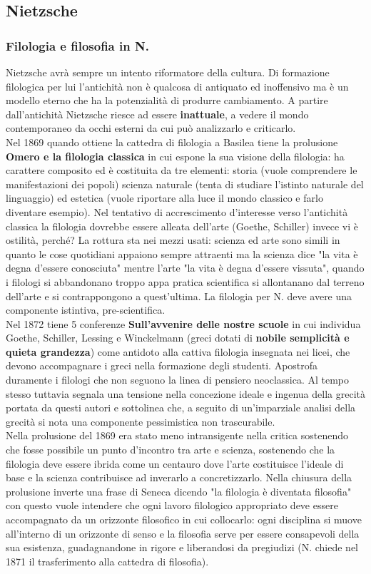\documentclass[10pt,a4paper]{article}
\begin{document}
\subsection{Nietzsche}
\subsubsection{Filologia e filosofia in N.}
 Nietzsche avrà sempre un intento riformatore della cultura. Di formazione filologica per lui l'antichità non è qualcosa di antiquato ed inoffensivo ma è un modello eterno che ha la potenzialità di produrre cambiamento. A partire dall'antichità Nietzsche riesce ad essere \textbf{inattuale}, a vedere il mondo contemporaneo da occhi esterni da cui può analizzarlo e criticarlo.\\
Nel 1869 quando ottiene la cattedra di filologia a Basilea tiene la prolusione \textbf{Omero e la filologia classica} in cui espone la sua visione della filologia: ha carattere composito ed è costituita da tre elementi: storia (vuole comprendere le manifestazioni dei popoli) scienza naturale (tenta di studiare l'istinto naturale del linguaggio) ed estetica (vuole riportare alla luce il mondo classico e farlo diventare esempio). Nel tentativo di accrescimento d'interesse verso l'antichità classica la filologia dovrebbe essere alleata dell'arte (Goethe, Schiller) invece vi è ostilità, perché? La rottura sta nei mezzi usati: scienza ed arte sono simili in quanto le cose quotidiani appaiono sempre attraenti ma la scienza dice "la vita è degna d'essere conosciuta" mentre l'arte "la vita è degna d'essere vissuta", quando i filologi si abbandonano troppo appa pratica scientifica si allontanano dal terreno dell'arte e si contrappongono a quest'ultima. La filologia per N. deve avere una componente istintiva, pre-scientifica.\\
Nel 1872 tiene 5 conferenze \textbf{Sull'avvenire delle nostre scuole} in cui individua Goethe, Schiller, Lessing e Winckelmann (greci dotati di \textbf{nobile semplicità e quieta grandezza}) come antidoto alla cattiva filologia insegnata nei licei, che devono accompagnare i greci nella formazione degli studenti. Apostrofa duramente i filologi che non seguono la linea di pensiero neoclassica. Al tempo stesso tuttavia segnala una tensione nella concezione ideale e ingenua della grecità portata da questi autori e sottolinea che, a seguito di un'imparziale analisi della grecità si nota una componente pessimistica non trascurabile.\\
Nella prolusione del 1869 era stato meno intransigente nella critica sostenendo che fosse possibile un punto d'incontro tra arte e scienza, sostenendo che la filologia deve essere ibrida come un centauro dove l'arte costituisce l'ideale di base e la scienza contribuisce ad inverarlo a concretizzarlo. Nella chiusura della prolusione inverte una frase di Seneca dicendo "la filologia è diventata filosofia" con questo vuole intendere che ogni lavoro filologico appropriato deve essere accompagnato da un orizzonte filosofico in cui collocarlo: ogni disciplina si muove all'interno di un orizzonte di senso e la filosofia serve per essere consapevoli della sua esistenza, guadagnandone in rigore e liberandosi da pregiudizi (N. chiede nel 1871 il trasferimento alla cattedra di filosofia).\\
\end{document}
